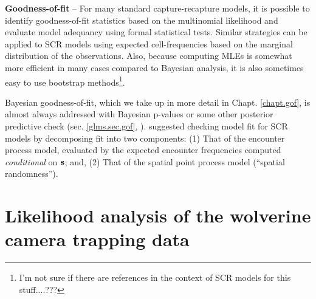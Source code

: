 {\bf Goodness-of-fit} -- For many standard capture-recapture models,
it is possible to identify goodness-of-fit statistics based on the
multinomial likelihood and evaluate model adequancy using formal
statistical tests. Similar strategies can be applied to SCR models
using expected cell-frequencies based on the marginal distribution of
the observations. Also, because computing MLEs is somewhat more
efficient in many cases compared to Bayesian analysis, it is also
sometimes easy to use bootstrap methods\footnote{I'm not sure if there
  are references in the context of SCR models for this stuff....???}.

Bayesian goodness-of-fit, which we take up in more detail in
Chapt. \ref{chapt.gof}, is almost always addressed with Bayesian
p-values or some other posterior predictive check
(sec. \ref{glms.sec.gof}, \citet[][sec. 2.6]{kery:2010}).
\citet{royle_etal:2011mee} suggested checking model fit for SCR models
by decomposing fit into two components: (1) That of the encounter
process model, evaluated by the expected encounter frequencies
computed {\it conditional} on ${\bf s}$; and, (2) That of the spatial
point process model (``spatial randomness'').


\section{Likelihood analysis of the wolverine camera trapping data}
\label{mle.sec.wolverine}


